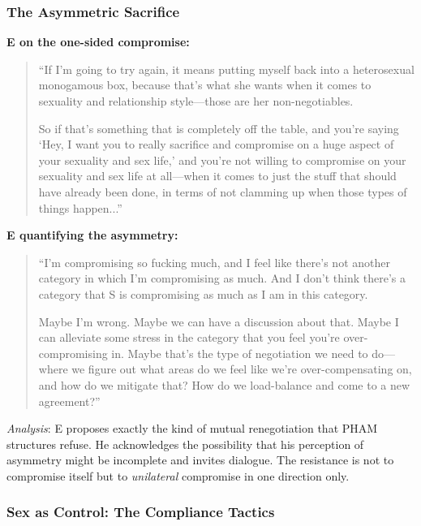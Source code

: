 \documentclass[12pt, letterpaper]{article}
\begin{document}
\subsubsection{The Asymmetric Sacrifice}

\textbf{E on the one-sided compromise:}
\begin{quote}
``If I'm going to try again, it means putting myself back into a heterosexual monogamous box, because that's what she wants when it comes to sexuality and relationship style---those are her non-negotiables.

So if that's something that is completely off the table, and you're saying `Hey, I want you to really sacrifice and compromise on a huge aspect of your sexuality and sex life,' and you're not willing to compromise on your sexuality and sex life at all---when it comes to just the stuff that should have already been done, in terms of not clamming up when those types of things happen...''
\end{quote}

\textbf{E quantifying the asymmetry:}
\begin{quote}
``I'm compromising so fucking much, and I feel like there's not another category in which I'm compromising as much. And I don't think there's a category that S is compromising as much as I am in this category.

Maybe I'm wrong. Maybe we can have a discussion about that. Maybe I can alleviate some stress in the category that you feel you're over-compromising in. Maybe that's the type of negotiation we need to do---where we figure out what areas do we feel like we're over-compensating on, and how do we mitigate that? How do we load-balance and come to a new agreement?''
\end{quote}

\textit{Analysis}: E proposes exactly the kind of mutual renegotiation that PHAM structures refuse. He acknowledges the possibility that his perception of asymmetry might be incomplete and invites dialogue. The resistance is not to compromise itself but to \textit{unilateral} compromise in one direction only.

\subsubsection{Sex as Control: The Compliance Tactics}
\end{document}
